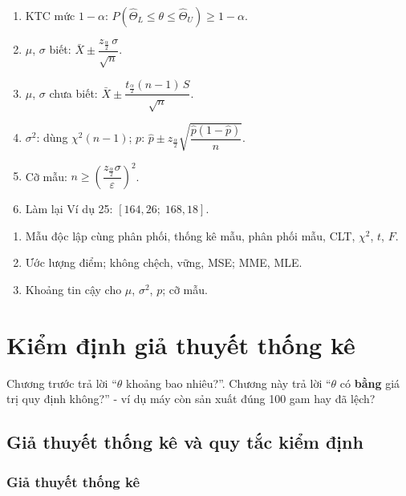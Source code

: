 \documentclass[12pt,a4paper]{article}
\begin{document}
\begin{tongket}[title={Tổng kết}]
\begin{enumerate}
  \item KTC mức $1-\alpha$: $P(\hat{\Theta}_L \le \theta \le \hat{\Theta}_U) \ge 1-\alpha$.
  \item $\mu$, $\sigma$ biết: $\bar{X} \pm \dfrac{z_{\frac{\alpha}{2}}\,\sigma}{\sqrt{n}}$.
  \item $\mu$, $\sigma$ chưa biết: $\bar{X} \pm \dfrac{t_{\frac{\alpha}{2}}(n-1)\,S}{\sqrt{n}}$.
  \item $\sigma^2$: dùng $\chi^2(n-1)$; $p$: $\hat{p} \pm z_{\frac{\alpha}{2}}\sqrt{\dfrac{\hat{p}(1-\hat{p})}{n}}$.
  \item Cỡ mẫu: $n \ge (\dfrac{z_{\frac{\alpha}{2}}\sigma}{\varepsilon})^2$.
  \item Làm lại Ví dụ 25: $[164{,}26;\;168{,}18]$.
\end{enumerate}
\end{tongket}

\begin{tongket}[title={Tổng kết}]
\begin{enumerate}
  \item Mẫu độc lập cùng phân phối, thống kê mẫu, phân phối mẫu, CLT, $\chi^2$, $t$, $F$.
  \item Ước lượng điểm; không chệch, vững, MSE; MME, MLE.
  \item Khoảng tin cậy cho $\mu$, $\sigma^2$, $p$; cỡ mẫu.
\end{enumerate}
\end{tongket}

\newpage
\section{Kiểm định giả thuyết thống kê}

\begin{dongco}[title={Động cơ}]
Chương trước trả lời ``$\theta$ khoảng bao nhiêu?''. Chương này trả lời ``$\theta$ có \textbf{bằng} giá trị quy định không?'' - ví dụ máy còn sản xuất đúng 100 gam hay đã lệch?
\end{dongco}

\subsection{Giả thuyết thống kê và quy tắc kiểm định}

\subsubsection{Giả thuyết thống kê}
\end{document}
